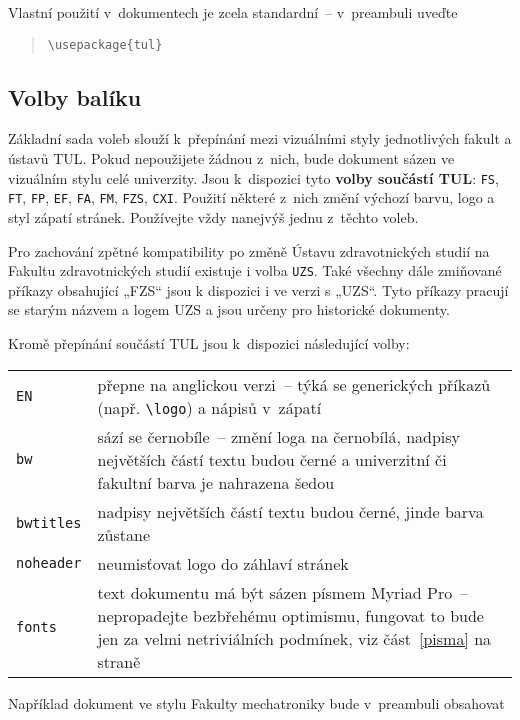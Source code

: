\documentclass[a4paper,12pt,twoside]{article}
\newcommand{\cmdfont}[1]{\texttt{\color{\tulcolor}#1}}
\newcommand{\cmd}[1]{\cmdfont{\textbackslash #1}}
\begin{document}
Vlastní použití v~dokumentech je zcela standardní~-- v~preambuli uveďte

\begin{quote}
\cmd{usepackage\{tul\}}
\end{quote}

\subsection*{Volby balíku}

Základní sada voleb slouží k~přepínání mezi vizuálními styly jednotlivých
fakult a ústavů TUL. Pokud nepoužijete žádnou z~nich, bude dokument sázen ve
vizuálním stylu celé univerzity. Jsou k~dispozici tyto \textbf{volby součástí
TUL}: \cmdfont{FS}, \cmdfont{FT}, \cmdfont{FP}, \cmdfont{EF}, \cmdfont{FA},
\cmdfont{FM}, \cmdfont{FZS}, \cmdfont{CXI}. Použití některé z~nich změní
výchozí barvu, logo a styl zápatí stránek. Používejte vždy nanejvýš jednu
z~těchto voleb.

Pro zachování zpětné kompatibility po změně Ústavu zdravotnických studií na
Fakultu zdravotnických studií existuje i volba \cmdfont{UZS}. Také všechny dále
zmiňované příkazy obsahující „FZS“ jsou k dispozici i ve verzi s „UZS“. Tyto
příkazy pracují se starým názvem a logem UZS a jsou určeny pro historické
dokumenty.

Kromě přepínání součástí TUL jsou k~dispozici následující volby:

\medskip

\begin{tabularx}{\textwidth}{@{}lX}
\cmdfont{EN} & přepne na anglickou verzi~-- týká se generických příkazů
(např. \cmd{logo}) a nápisů v~zápatí\\
\cmdfont{bw} & sází se černobíle~-- změní loga na černobílá, nadpisy největších
částí textu budou černé a univerzitní či fakultní barva je nahrazena šedou \\
\cmdfont{bwtitles} & nadpisy největších částí textu budou černé, jinde barva zůstane \\
\cmdfont{noheader} & neumisťovat logo do záhlaví stránek \\
\cmdfont{fonts} & text dokumentu má být sázen písmem Myriad Pro~-- nepropadejte
bezbřehému optimismu, fungovat to bude jen za velmi netriviálních podmínek, viz
část~\ref{pisma} na straně~\pageref{pisma}
\end{tabularx}

\medskip

Například dokument ve stylu Fakulty mechatroniky bude v~preambuli obsahovat
\end{document}
